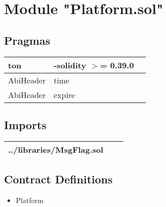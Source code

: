 
\section{Module "Platform.sol"}


\subsection{Pragmas}


\noindent\begin{tabular}{|l|l|p{5cm}|}\hline
ton & -solidity $>$= 0.39.0 &\\\hline
AbiHeader &  time &\\\hline
AbiHeader &  expire &\\\hline
\end{tabular}


\subsection{Imports}


\noindent\begin{tabular}{|l|l|p{5cm}|}\hline
../libraries/MsgFlag.sol &\\\hline
\end{tabular}


\subsection{Contract Definitions}

\begin{itemize}
\item Platform
\end{itemize}
